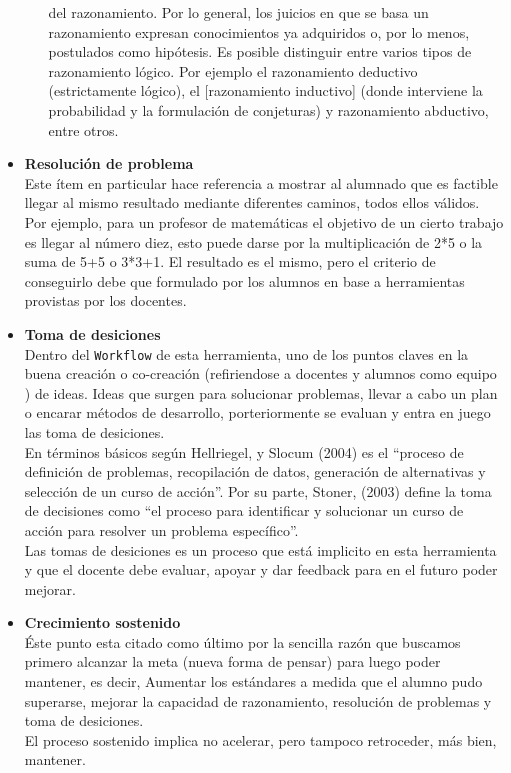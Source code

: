 \begin{itemize}
\begin{itemize}
  del razonamiento. Por lo general, los juicios en que se basa un razonamiento expresan conocimientos ya adquiridos o, por lo menos, postulados como hipótesis. 
  Es posible distinguir entre varios tipos de razonamiento lógico. Por ejemplo el razonamiento deductivo (estrictamente lógico), el [razonamiento inductivo] 
  (donde interviene la probabilidad y la formulación de conjeturas) y razonamiento abductivo, entre otros.
 \end{itemize}     
 \item \textbf{Resoluci\'on de problema}\\
 Este \'item en particular hace referencia a mostrar al alumnado que es factible llegar al mismo resultado mediante diferentes caminos, todos ellos v\'alidos.\\
 Por ejemplo, para un profesor de matem\'aticas el objetivo de un cierto trabajo es llegar al n\'umero diez, esto puede darse por la multiplicaci\'on de 2*5 o 
 la suma de 5+5 o 3*3+1. El resultado es el mismo, pero el criterio de conseguirlo debe que formulado por los alumnos en base a herramientas provistas por los
 docentes. 
 \item \textbf{Toma de desiciones}\\
 Dentro del \texttt{Workflow} de esta herramienta, uno de los puntos claves en la buena creaci\'on o co-creaci\'on (refiriendose a docentes y alumnos como equipo
 ) de ideas. Ideas que surgen para solucionar problemas, llevar a cabo un plan o encarar m\'etodos de desarrollo, porteriormente se evaluan y entra en juego las
 toma de desiciones.\\
 En t\'erminos b\'asicos seg\'un Hellriegel, y Slocum (2004) es el “proceso de definici\'on de problemas, recopilaci\'on de datos, generaci\'on de alternativas 
 y selecci\'on de un curso de acci\'on”. Por su parte, Stoner, (2003) define la toma de decisiones como “el proceso para identificar y solucionar un curso de 
 acción para resolver un problema espec\'ifico”.\\
 Las tomas de desiciones es un proceso que est\'a implicito en esta herramienta y que el docente debe evaluar, apoyar y dar feedback para en el futuro poder 
 mejorar.
 \item \textbf{Crecimiento sostenido}\\
 \'Este punto esta citado como \'ultimo por la sencilla raz\'on que buscamos primero alcanzar la meta (nueva forma de pensar) para luego poder mantener, es decir, 
 Aumentar los est\'andares a medida que el alumno pudo superarse, mejorar la capacidad de razonamiento, resoluci\'on de problemas y toma de desiciones.\\
 El proceso sostenido implica no acelerar, pero tampoco retroceder, m\'as bien, mantener.
\end{itemize}
